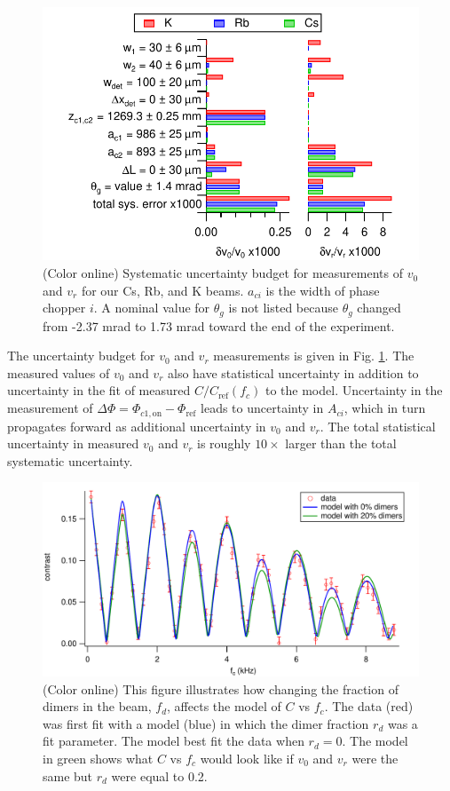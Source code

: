 \documentclass[twocolumn,prl,showpacs,superscriptaddress]{revtex4-1}   %
\newcommand{\figref}[1]{Fig. \ref{#1}}
\begin{document}
\begin{figure}
\includegraphics[width=\linewidth,keepaspectratio]{displayVelErrors.pdf}
\caption{\label{velError}(Color online) Systematic uncertainty budget for measurements of $v_0$ and $v_r$ for our Cs, Rb, and K beams. $a_{ci}$ is the width of phase chopper $i$. A nominal value for $\theta_g$ is not listed because $\theta_g$ changed from -2.37 mrad to 1.73 mrad toward the end of the experiment.}
\end{figure}

The uncertainty budget for $v_0$ and $v_r$ measurements is given in \figref{velError}. 
The measured values of $v_0$ and $v_r$ also have statistical uncertainty in addition to uncertainty in the fit of measured $C/C_{\mathrm{ref}}(f_c)$ to the model. Uncertainty in the measurement of $\Delta\Phi = \Phi_{c1,\mathrm{on}} - \Phi_{\mathrm{ref}}$ leads to uncertainty in $A_{ci}$, which in turn propagates forward as additional uncertainty in $v_0$ and $v_r$. The total statistical uncertainty in measured $v_0$ and $v_r$ is roughly $10\times$ larger than the total systematic uncertainty.

\begin{figure}
\includegraphics[width=\linewidth,keepaspectratio]{CvCFDimers_140924.pdf}
\caption{\label{CvCFDimers}(Color online) This figure illustrates how changing the fraction of dimers in the beam, $f_d$, affects the model of $C$ vs $f_c$. The data (red) was first fit with a model (blue) in which the dimer fraction $r_d$ was a fit parameter. The model best fit the data when $r_d = 0$. The model in green shows what $C$ vs $f_c$ would look like if $v_0$ and $v_r$ were the same but $r_d$ were equal to 0.2.}
\end{figure}
\end{document}
